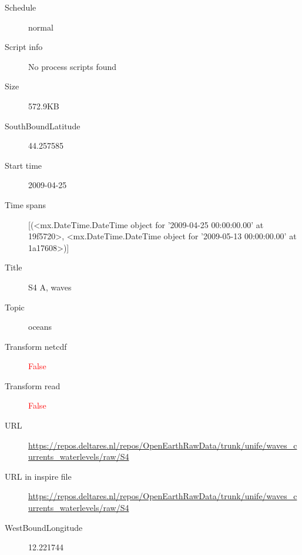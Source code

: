 \documentclass[9]{report}
\begin{document}
\begin{description}
\begin{verbatim}
\end{verbatim}
  \item[Schedule] normal
  \item[Script info] No process scripts found
  \item[Size] 572.9KB
  \item[SouthBoundLatitude] 44.257585
  \item[Start time] 2009-04-25
  \item[Time spans] [(<mx.DateTime.DateTime object for '2009-04-25 00:00:00.00' at 19f5720>, <mx.DateTime.DateTime object for '2009-05-13 00:00:00.00' at 1a17608>)]
  \item[Title]  S4 A, waves 
  \item[Topic] oceans
  \item[Transform netcdf] \textcolor{red}{False}
  \item[Transform read] \textcolor{red}{False}
  \item[URL] \href{https://repos.deltares.nl/repos/OpenEarthRawData/trunk/unife/waves\_currents\_waterlevels/raw/S4}{https://repos.deltares.nl/repos/OpenEarthRawData/trunk/unife/waves\_currents\_waterlevels/raw/S4}
  \item[URL in inspire file] \href{https://repos.deltares.nl/repos/OpenEarthRawData/trunk/unife/waves\_currents\_waterlevels/raw/S4}{https://repos.deltares.nl/repos/OpenEarthRawData/trunk/unife/waves\_currents\_waterlevels/raw/S4}
  \item[WestBoundLongitude] 12.221744
\end{description}
\end{document}
